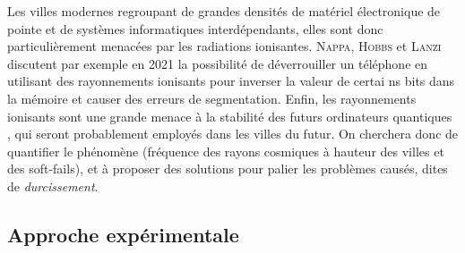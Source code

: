 \documentclass[a4paper,french,bookmarks]{article}
\begin{document}
    Les villes modernes regroupant de grandes densités de matériel électronique de pointe et de systèmes informatiques interdépendants, elles sont donc particulièrement menacées par les radiations ionisantes. \textsc{Nappa}, \textsc{Hobbs} et \textsc{Lanzi} discutent par exemple en 2021 \cite{nappa2021dejavu} la possibilité de déverrouiller un téléphone en utilisant des rayonnements ionisants pour inverser la valeur de certai   ns bits dans la mémoire et causer des erreurs de segmentation. Enfin, les rayonnements ionisants sont une grande menace à la stabilité des futurs ordinateurs quantiques \cite{nappa2021dejavu}, qui seront probablement employés dans les villes du futur. On cherchera donc de quantifier le phénomène (fréquence des rayons cosmiques à hauteur des villes et des soft-fails), et à proposer des solutions pour palier les problèmes causés, dites de \emph{durcissement}.

    \subsection{Approche expérimentale}
\end{document}
